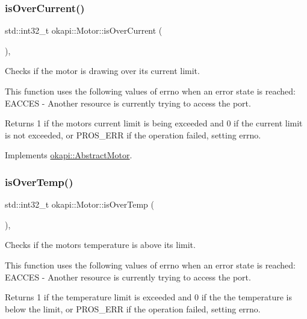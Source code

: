 \subsubsection{\texorpdfstring{isOverCurrent()}{isOverCurrent()}}
{\footnotesize\ttfamily std\+::int32\+\_\+t okapi\+::\+Motor\+::is\+Over\+Current (\begin{DoxyParamCaption}{ }\end{DoxyParamCaption})\hspace{0.3cm}{\ttfamily [override]}, {\ttfamily [virtual]}}

Checks if the motor is drawing over its current limit.

This function uses the following values of errno when an error state is reached\+: E\+A\+C\+C\+ES -\/ Another resource is currently trying to access the port.

\begin{DoxyReturn}{Returns}
1 if the motor\textquotesingle{}s current limit is being exceeded and 0 if the current limit is not exceeded, or P\+R\+O\+S\+\_\+\+E\+RR if the operation failed, setting errno. 
\end{DoxyReturn}


Implements \mbox{\hyperlink{classokapi_1_1AbstractMotor_a3d365496ebb8566c0a12611f090c5231}{okapi\+::\+Abstract\+Motor}}.

\mbox{\label{classokapi_1_1Motor_a8a51f7dede42f768280b73d85a528d91}} 
\subsubsection{\texorpdfstring{isOverTemp()}{isOverTemp()}}
{\footnotesize\ttfamily std\+::int32\+\_\+t okapi\+::\+Motor\+::is\+Over\+Temp (\begin{DoxyParamCaption}{ }\end{DoxyParamCaption})\hspace{0.3cm}{\ttfamily [override]}, {\ttfamily [virtual]}}

Checks if the motor\textquotesingle{}s temperature is above its limit.

This function uses the following values of errno when an error state is reached\+: E\+A\+C\+C\+ES -\/ Another resource is currently trying to access the port.

\begin{DoxyReturn}{Returns}
1 if the temperature limit is exceeded and 0 if the the temperature is below the limit, or P\+R\+O\+S\+\_\+\+E\+RR if the operation failed, setting errno. 
\end{DoxyReturn}


